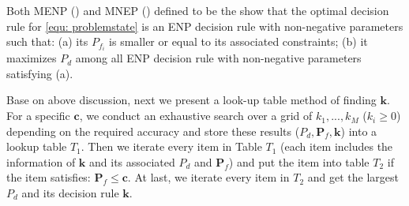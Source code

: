Both MENP () and MNEP () defined to be the show that the optimal decision rule for \eqref{equ: problemstate} is an ENP decision rule  with non-negative parameters such that: (a) its $P_{f_i}$ is smaller or equal to its associated constraints; (b) it maximizes $P_d$ among all ENP decision rule with non-negative parameters satisfying (a).

Base on above discussion, 
next we present a look-up table method of finding $\mathbf{k}$. For a specific $\mathbf{c}$, we conduct an exhaustive search over a grid of $k_1, ..., k_M$ ($k_i \geq 0$) depending on the required accuracy and store these results ($P_d, \mathbf{P}_f, \mathbf{k}$) into a lookup table $T_1$. 
Then we iterate every item in Table $T_1$ (each item includes the information of $\mathbf{k}$ and its associated $P_d$ and $\mathbf{P}_f$) and put the item into table $T_2$ if the item satisfies:  $\mathbf{P}_f \leq \mathbf{c}$. At last, we iterate every item in $T_2$ and get the largest $P_d$ and its decision rule $\mathbf{k}$.

